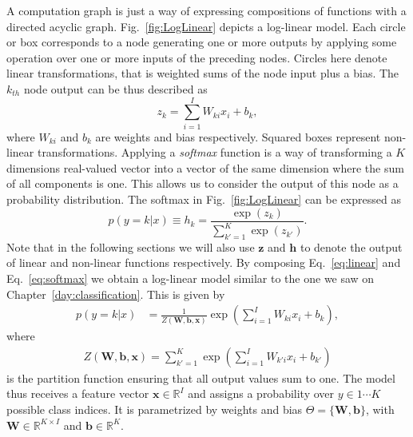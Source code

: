 A computation graph is just a way of expressing compositions of functions with
a directed acyclic graph. Fig.~\ref{fig:LogLinear} depicts a log-linear model.
Each circle or box corresponds to a node generating one or more outputs by
applying some operation over one or more inputs of the preceding nodes. Circles
here denote linear transformations, that is weighted sums of the node input
plus a bias. The $k_{th}$ node output can be thus described as
%
\begin{equation}
    z_k = \sum_{i=1}^{I} W_{ki} x_i + b_k,
\label{eq:linear}
\end{equation}
%
where $W_{ki}$ and $b_k$ are weights and bias respectively. Squared boxes
represent non-linear transformations. Applying a \textit{softmax} function is a
way of transforming a $K$ dimensions real-valued vector into a vector of the
same dimension where the sum of all components is one. This allows us to
consider the output of this node as a probability distribution. The softmax in
Fig.~\ref{fig:LogLinear} can be expressed as
%
\begin{equation}
p(y=k|{x}) \equiv h_k = \frac{\exp(z_k)}{\sum_{k'=1}^{K} \exp(z_{k'})}.
\label{eq:softmax}
\end{equation}
%
Note that in the following sections we will also use $\mathbf{z}$ and
$\mathbf{h}$ to denote the output of linear and non-linear functions
respectively. By composing Eq.~\ref{eq:linear} and Eq.~\ref{eq:softmax} we
obtain a log-linear model similar to the one we saw on
Chapter~\ref{day:classification}\footnotemark{}. This is given by
%
\begin{align}
p(y=k|{x}) & = \frac{1}{Z(\mathbf{W},\mathbf{b},\mathbf{x})}\exp\left(\sum_{i=1}^{I} W_{ki} x_i + b_k\right),
\label{eq:loglineargen}
\end{align}
%
\noindent where
\begin{align}
Z(\mathbf{W},\mathbf{b},\mathbf{x}) = \sum_{k'=1}^{K} \exp\left(\sum_{i=1}^{I} W_{k'i} x_i + b_{k'}\right)
\label{eq:loglineargenPartition}
\end{align}
%
is the partition function ensuring that all output values sum to one. The model thus receives a feature vector
$\mathbf{x} \in \mathbb{R}^{I}$ and assigns a probability over $y \in {1 \cdots K}$ possible
class indices. It is parametrized by weights and bias $\Theta=\{\mathbf{W},
\mathbf{b}\}$, with $\mathbf{W} \in \mathbb{R}^{K \times I}$ and $\mathbf{b}
\in \mathbb{R}^{K}$.

